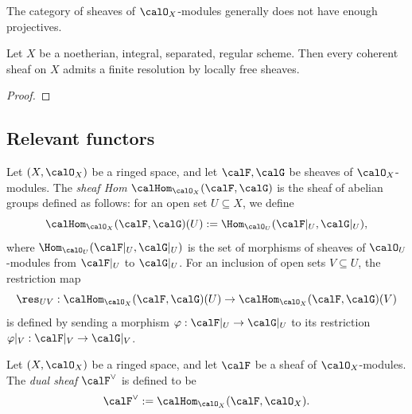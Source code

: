     \begin{remark}\label{thm:O_X_mod_has}
        The category of sheaves of \(\calO_X\)-modules generally does not have enough projectives.
    \end{remark}

    \begin{theorem}\label{thm:locally_free_resolution_of_coherent_sheaves}
        Let \(X\) be a noetherian, integral, separated, regular scheme.
        Then every coherent sheaf on \(X\) admits a finite resolution by locally free sheaves.
    \end{theorem}
    \begin{proof}
    \end{proof}


\subsection{Relevant functors}

    \begin{definition}\label{def:hom_sheaves}
        Let \((X,\calO_X)\) be a ringed space, and let \(\calF,\calG\) be sheaves of \(\calO_X\)-modules.
        The \emph{sheaf Hom} \(\calHom_{\calO_X}(\calF,\calG)\) is the sheaf of abelian groups defined as follows:
        for an open set \(U\subseteq X\), we define
        \[
            \calHom_{\calO_X}(\calF,\calG)(U) := \Hom_{\calO_U}(\calF|_U,\calG|_U),
        \]
        where \(\Hom_{\calO_U}(\calF|_U,\calG|_U)\) is the set of morphisms of sheaves of \(\calO_U\)-modules from \(\calF|_U\) to \(\calG|_U\).
        For an inclusion of open sets \(V\subseteq U\), the restriction map
        \[
            \res_{UV}:\calHom_{\calO_X}(\calF,\calG)(U) \to \calHom_{\calO_X}(\calF,\calG)(V)
        \]
        is defined by sending a morphism \(\varphi:\calF|_U \to \calG|_U\) to its restriction \(\varphi|_V:\calF|_V \to \calG|_V\).
    \end{definition}

    \begin{definition}\label{def:dual_sheaves}
        Let \((X,\calO_X)\) be a ringed space, and let \(\calF\) be a sheaf of \(\calO_X\)-modules.
        The \emph{dual sheaf} \(\calF^\vee\) is defined to be
        \[
            \calF^\vee := \calHom_{\calO_X}(\calF,\calO_X).
        \]
    \end{definition}

